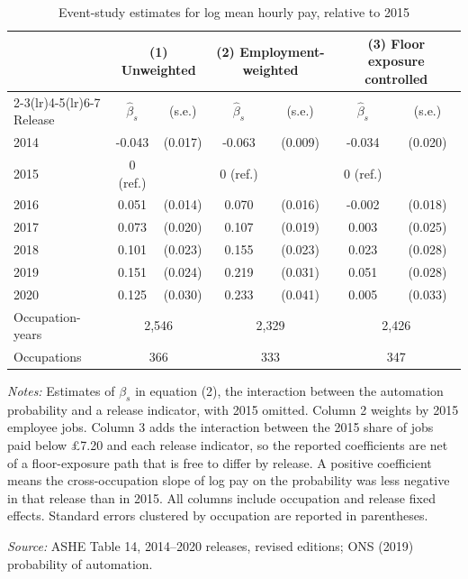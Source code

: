\begin{table}[!ht]\centering
\caption{Event-study estimates for log mean hourly pay, relative to 2015}\label{tab:espay}
\begin{threeparttable}\footnotesize\setlength{\tabcolsep}{3pt}
\begin{tabular}{lcccccc}\toprule
 & \multicolumn{2}{c}{(1) Unweighted} & \multicolumn{2}{c}{(2) Employment-weighted} & \multicolumn{2}{c}{(3) Floor exposure controlled} \\
\cmidrule(lr){2-3}\cmidrule(lr){4-5}\cmidrule(lr){6-7}
Release & $\hat{\beta}_{s}$ & (s.e.) & $\hat{\beta}_{s}$ & (s.e.) & $\hat{\beta}_{s}$ & (s.e.) \\ \midrule
2014 & -0.043 & (0.017) & -0.063 & (0.009) & -0.034 & (0.020) \\
2015 & 0 (ref.) &  & 0 (ref.) &  & 0 (ref.) &  \\
2016 & 0.051 & (0.014) & 0.070 & (0.016) & -0.002 & (0.018) \\
2017 & 0.073 & (0.020) & 0.107 & (0.019) & 0.003 & (0.025) \\
2018 & 0.101 & (0.023) & 0.155 & (0.023) & 0.023 & (0.028) \\
2019 & 0.151 & (0.024) & 0.219 & (0.031) & 0.051 & (0.028) \\
2020 & 0.125 & (0.030) & 0.233 & (0.041) & 0.005 & (0.033) \\
\addlinespace
Occupation-years & \multicolumn{2}{c}{2,546} & \multicolumn{2}{c}{2,329} & \multicolumn{2}{c}{2,426} \\
Occupations & \multicolumn{2}{c}{366} & \multicolumn{2}{c}{333} & \multicolumn{2}{c}{347} \\
\bottomrule\end{tabular}
\begin{tablenotes}\footnotesize
\item \emph{Notes:} Estimates of $\beta_{s}$ in equation (2), the interaction between the automation probability and a release indicator, with 2015 omitted. Column 2 weights by 2015 employee jobs. Column 3 adds the interaction between the 2015 share of jobs paid below \pounds 7.20 and each release indicator, so the reported coefficients are net of a floor-exposure path that is free to differ by release. A positive coefficient means the cross-occupation slope of log pay on the probability was less negative in that release than in 2015. All columns include occupation and release fixed effects. Standard errors clustered by occupation are reported in parentheses.
\item \emph{Source:} ASHE Table 14, 2014--2020 releases, revised editions; ONS (2019) probability of automation.
\end{tablenotes}\end{threeparttable}\end{table}